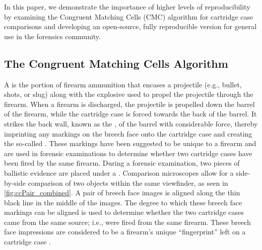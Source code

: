 In this paper, we demonstrate the importance of higher levels of
reproducibility by examining the Congruent Matching Cells (CMC)
algorithm for cartridge case comparisons and developing an open-source,
fully reproducible version for general use in the forensics community.

\hypertarget{the-congruent-matching-cells-algorithm}{%
\subsection{The Congruent Matching Cells
Algorithm}\label{the-congruent-matching-cells-algorithm}}

A  is the portion of firearm ammunition that encases
a projectile (e.g., bullet, shots, or slug) along with the explosive
used to propel the projectile through the firearm. When a firearm is
discharged, the projectile is propelled down the barrel of the firearm,
while the cartridge case is forced towards the back of the barrel. It
strikes the back wall, known as the , of the barrel
with considerable force, thereby imprinting any markings on the breech
face onto the cartridge case and creating the so-called
. These markings have been suggested to be
unique to a firearm and are used in forensic examinations to determine
whether two cartridge cases have been fired by the same firearm. During
a forensic examination, two pieces of ballistic evidence are placed
under a . Comparison microscopes allow for a
side-by-side comparison of two objects within the same viewfinder, as
seen in \autoref{fig:ccPair_combined}. A pair of breech face images is
aligned along the thin black line in the middle of the images. The
degree to which these breech face markings can be aligned is used to
determine whether the two cartridge cases came from the same source;
i.e., were fired from the same firearm. These breech face impressions
are considered to be a firearm's unique ``fingerprint'' left on a
cartridge case \citep{firearm_id_thompson}.

